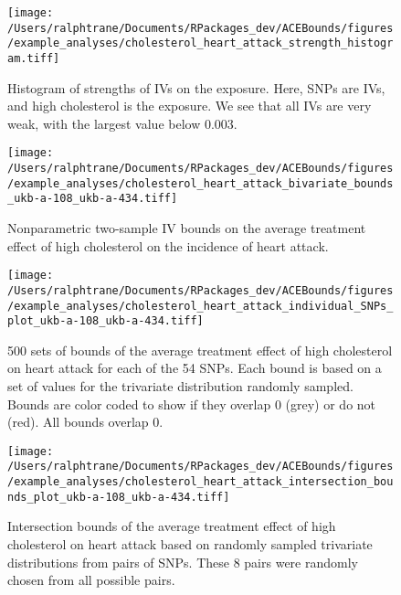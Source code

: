 \documentclass[AMA,STIX1COL,]{WileyNJD-v2}
\begin{document}
\begin{figure}[ht]
 \center
 \texttt{[image: /Users/ralphtrane/Documents/RPackages\_dev/ACEBounds/figures/example\_analyses/cholesterol\_heart\_attack\_strength\_histogram.tiff]}
 \caption{Histogram of strengths of IVs on the exposure. Here, SNPs are IVs, and high cholesterol is the exposure. We see that all IVs are very weak, with the largest value below 0.003.}
 \label{fig:cholesterol_heart_attack_strength_histogram}
\end{figure}

\begin{figure}[ht]
  \texttt{[image: /Users/ralphtrane/Documents/RPackages\_dev/ACEBounds/figures/example\_analyses/cholesterol\_heart\_attack\_bivariate\_bounds\_ukb-a-108\_ukb-a-434.tiff]}
  \caption{Nonparametric two-sample IV bounds on the average treatment effect of high cholesterol on the incidence of heart attack.}
  \label{fig:cholesterol_on_heart_attack_ind_bounds}
\end{figure}

\clearpage

\begin{sidewaysfigure}
  \center
  \texttt{[image: /Users/ralphtrane/Documents/RPackages\_dev/ACEBounds/figures/example\_analyses/cholesterol\_heart\_attack\_individual\_SNPs\_plot\_ukb-a-108\_ukb-a-434.tiff]}
    \caption{500 sets of bounds of the average treatment effect of high cholesterol on heart attack for each of the 54 SNPs. Each bound is based on a set of values for the trivariate distribution randomly sampled. Bounds are color coded to show if they overlap 0 (grey) or do not (red). All bounds overlap 0.}
    \label{fig:cholesterol_heart_attack_tri_bounds_all}
\end{sidewaysfigure}

\clearpage

\begin{figure}[ht]
  \center
  \texttt{[image: /Users/ralphtrane/Documents/RPackages\_dev/ACEBounds/figures/example\_analyses/cholesterol\_heart\_attack\_intersection\_bounds\_plot\_ukb-a-108\_ukb-a-434.tiff]}
  \caption{Intersection bounds of the average treatment effect of high cholesterol on heart attack based on randomly sampled trivariate distributions from pairs of SNPs. These 8 pairs were randomly chosen from all possible pairs.}
  \label{fig:cholesterol_on_heart_attack_intersections}
\end{figure}

\newpage


\end{document}

